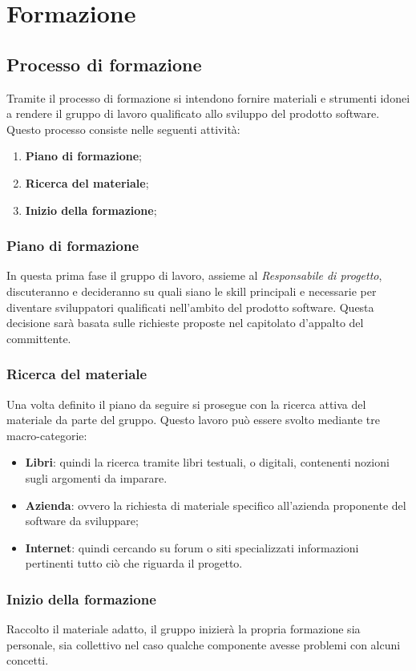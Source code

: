 \chapter{Formazione}\label{Formazione}
\section{Processo di formazione}\label{8.1}
Tramite il processo di formazione si intendono fornire materiali e strumenti idonei a rendere il gruppo di lavoro qualificato allo sviluppo del prodotto software.
Questo processo consiste nelle seguenti attività:
\begin{enumerate}
	\item \textbf{Piano di formazione};
	\item \textbf{Ricerca del materiale};
	\item \textbf{Inizio della formazione};
\end{enumerate}
\subsection{Piano di formazione}\label{8.1.1}
In questa prima fase il gruppo di lavoro, assieme al \textit{Responsabile di progetto}, discuteranno e decideranno su quali siano le skill principali e necessarie per diventare sviluppatori qualificati nell'ambito del prodotto software.
Questa decisione sarà basata sulle richieste proposte nel capitolato d'appalto del committente.
\subsection{Ricerca del materiale}\label{8.1.2}
Una volta definito il piano da seguire si prosegue con la ricerca attiva del materiale da parte del gruppo.
Questo lavoro può essere svolto mediante tre macro-categorie:
\begin{itemize}
	\item \textbf{Libri}: quindi la ricerca tramite libri testuali, o digitali, contenenti nozioni sugli argomenti da imparare.
	\item \textbf{Azienda}: ovvero la richiesta di materiale specifico all'azienda proponente del software da sviluppare;
	\item \textbf{Internet}: quindi cercando su forum o siti specializzati informazioni pertinenti tutto ciò che riguarda il progetto.
\end{itemize}
\subsection{Inizio della formazione}\label{8.1.3}
Raccolto il materiale adatto, il gruppo inizierà la propria formazione sia personale, sia collettivo nel caso qualche componente avesse problemi con alcuni concetti.
